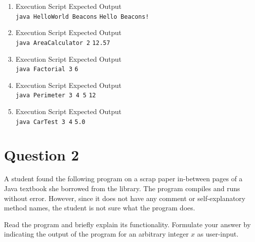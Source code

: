 \documentclass[12pt,letterpaper,twoside]{article}
\begin{document}
\begin{enumerate}[label=\textbf{(\alph*)}]

\item Execution Script \hfill Expected Output\\
\texttt{java HelloWorld Beacons} \hfill \texttt{Hello Beacons!}


\item Execution Script \hfill Expected Output\\
\texttt{java AreaCalculator 2} \hfill \texttt{12.57}


\item Execution Script \hfill Expected Output\\
\texttt{java Factorial 3} \hfill \texttt{6}


\item Execution Script \hfill Expected Output\\
\texttt{java Perimeter 3 4 5} \hfill \texttt{12}


\item Execution Script \hfill Expected Output\\
\texttt{java CarTest 3 4} \hfill \texttt{5.0}



\end{enumerate}

\newpage

\section*{Question 2}

A student found the following program on a scrap paper in-between pages of a Java textbook she borrowed from the library.
The program compiles and runs without error.
However, since it does not have any comment or self-explanatory method names, the student is not sure what the program does.

Read the program and briefly explain its functionality.
Formulate your answer by indicating the output of the program for an arbitrary integer $x$ as user-input.
\end{document}
